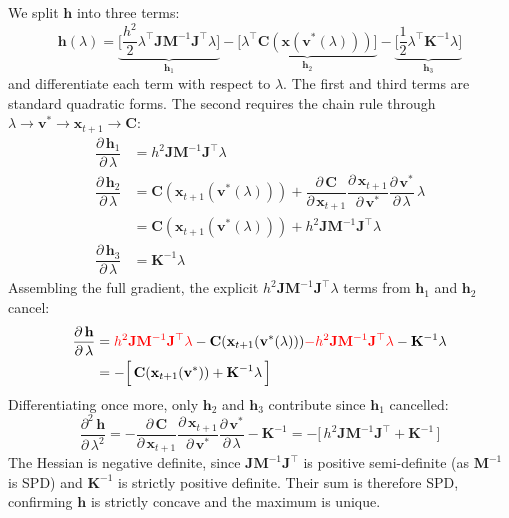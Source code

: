 \documentclass{article}
\newcommand{\pd}[2]{\dfrac{\partial\, #1}{\partial\, #2}}
\newcommand{\pdv}[2]{\dfrac{\partial^2\, #1}{\partial\, #2^2}}
\newcommand{\drop}[1]{\textcolor{red}{#1}}
\begin{document}
\begin{derivation}
We split $\mathbf{h}$ into three terms:
%
\begin{equation*}
\mathbf{h}(\lambda) = 
\underbrace{
    \bigg[
    \frac{h^2}{2}\lambda^\top\mathbf{J}\mathbf{M}^{-1}\mathbf{J}^\top\lambda
    \bigg]
}_{\mathbf{h}_1} -
\underbrace{
    \bigg[
    \lambda^\top\mathbf{C}(\mathbf{x}(\mathbf{v}^*(\lambda))) 
    \bigg]
}_{\mathbf{h}_2} -
\underbrace{
\bigg[
    \frac{1}{2}\lambda^\top\mathbf{K}^{-1}\lambda
\bigg]
}_{\mathbf{h}_3}
\end{equation*}
%
and differentiate each term with respect to $\lambda$. The first and third terms are standard quadratic forms. The second requires the chain rule through $\lambda \to \mathbf{v}^*\to \mathbf{x}_{t+1} \to \mathbf{C}$:
%
\begin{equation*}
\begin{aligned}
\pd{\mathbf{h}_1}{\lambda} &= 
    h^2\mathbf{J}\mathbf{M}^{-1}\mathbf{J}^\top\lambda\\[4pt]
\pd{\mathbf{h}_2}{\lambda} &= 
    \mathbf{C}(\mathbf{x}_{t+1}(\mathbf{v}^*(\lambda))) + 
    \pd{\mathbf{C}}{\mathbf{x}_{t+1}}
    \pd{\mathbf{x}_{t+1}}{\mathbf{v}^*}
    \pd{\mathbf{v}^*}{\lambda}\, \lambda \\
    &= 
    \mathbf{C}(\mathbf{x}_{t+1}(\mathbf{v}^*(\lambda))) + 
    h^2 \mathbf{J}\mathbf{M}^{-1}\mathbf{J}^\top\lambda \\[4pt]
\pd{\mathbf{h}_3}{\lambda} &= 
    \mathbf{K}^{-1}\lambda
\end{aligned}
\end{equation*}
%
Assembling the full gradient, the explicit $h^2\mathbf{J}\mathbf{M}^{-1}\mathbf{J}^\top\lambda$ terms from $\mathbf{h}_1$ and $\mathbf{h}_2$ cancel:
%
\begin{equation*}
\begin{aligned}
\pd{\mathbf{h}}{\lambda} 
    &= 
    \drop{h^2\mathbf{J}\mathbf{M}^{-1}\mathbf{J}^\top\lambda} - 
    \mathbf{C}(\mathbf{x}_{t+1}(\mathbf{v}^*(\lambda)))
    \drop{- h^2\mathbf{J}\mathbf{M}^{-1}\mathbf{J}^\top\lambda} -
    \mathbf{K}^{-1}\lambda  \\
    &=
    - \Big[\, \mathbf{C}(\mathbf{x}_{t+1}(\mathbf{v}^*)) + \mathbf{K}^{-1}\lambda\, \Big]
\end{aligned}
\end{equation*}
%
Differentiating once more, only $\mathbf{h}_2$ and $\mathbf{h}_3$ contribute since $\mathbf{h}_1$ cancelled:
%
\begin{equation*}
\pdv{\mathbf{h}}{\lambda} =
    -\pd{\mathbf{C}}{\mathbf{x}_{t+1}}
    \pd{\mathbf{x}_{t+1}}{\mathbf{v}^*}
    \pd{\mathbf{v}^*}{\lambda} - \mathbf{K}^{-1}
    =
    -\Big[\, h^2\mathbf{J}\mathbf{M}^{-1}\mathbf{J}^\top + \mathbf{K}^{-1}\,\Big]
\end{equation*}
%
The Hessian is negative definite, since $\mathbf{J}\mathbf{M}^{-1}\mathbf{J}^\top$ is positive semi-definite (as $\mathbf{M}^{-1}$ is SPD) and $\mathbf{K}^{-1}$ is strictly positive definite. Their sum is therefore SPD, confirming $\mathbf{h}$ is strictly concave and the maximum is unique.
\end{derivation}
\end{document}
